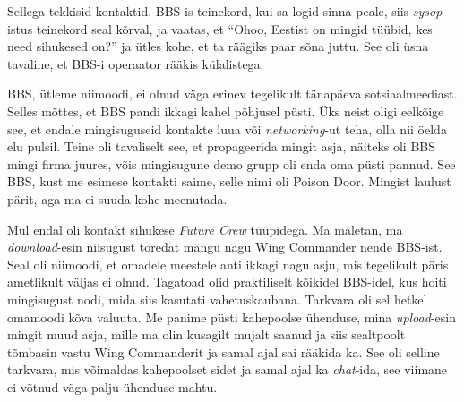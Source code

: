 Sellega tekkisid kontaktid. BBS-is teinekord, kui sa logid sinna peale, siis 
\emph{sysop} istus teinekord seal kõrval, ja vaatas, et \enquote{Ohoo,  Eestist 
on mingid tüübid, kes need sihukesed on?} ja ütles kohe, et ta räägiks paar 
sõna juttu. See oli üsna tavaline, et BBS-i operaator rääkis külalistega.

BBS, ütleme niimoodi, ei olnud väga erinev tegelikult tänapäeva 
sotsiaalmeediast. Selles mõttes, et BBS pandi ikkagi kahel põhjusel püsti. Üks 
neist oligi eelkõige see, et endale mingisuguseid kontakte luua või 
\emph{networking}-ut teha, olla nii öelda elu pulsil. Teine oli tavaliselt see, 
et propageerida mingit asja,  näiteks oli BBS mingi firma juures, võis 
mingisugune demo grupp oli enda oma püsti pannud. See BBS, kust me esimese 
kontakti saime, selle nimi oli Poison Door. Mingist 
laulust pärit, aga ma ei suuda kohe meenutada.

                 
Mul endal oli kontakt sihukese \emph{Future Crew} tüüpidega. Ma mäletan, ma \emph{download}-esin niisugust 
toredat mängu nagu Wing Commander nende BBS-ist. 
Seal oli niimoodi, et omadele meestele anti ikkagi nagu asju, mis tegelikult 
päris ametlikult väljas ei olnud. Tagatoad olid praktiliselt kõikidel BBS-idel, 
kus hoiti mingisugust nodi, mida siis kasutati vahetuskaubana. Tarkvara oli sel 
hetkel omamoodi kõva valuuta. Me panime püsti kahepoolse ühenduse, mina 
\emph{upload}-esin mingit muud asja, mille ma olin kusagilt mujalt saanud ja 
siis  sealtpoolt tõmbasin vastu Wing Commanderit ja samal ajal sai rääkida ka. 
See oli selline tarkvara, mis võimaldas kahepoolset sidet ja samal ajal ka 
\emph{chat}-ida, see viimane ei võtnud väga palju ühenduse mahtu.

